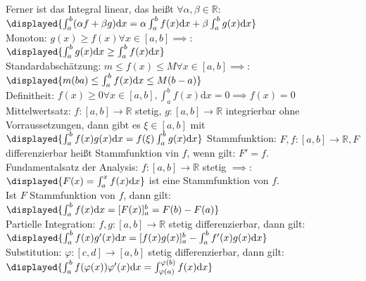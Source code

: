 \documentclass[9pt, landscape,a4paper]{extarticle}
\renewcommand{\phi}{\varphi}
\renewcommand\d{\mathrm{d}}
\begin{document}
\begin{multicols*}{4}
  Ferner ist das Integral linear, das heißt $\forall \alpha,\beta \in \mathbb{R}$: \\
  $\displayed{\int_a^b (\alpha f + \beta g)\d x = \alpha \int_a^b f(x)\d x + \beta \int_a^b g(x)\d x}$ \\
  Monoton: $g(x) \geq f(x) \forall x\in[a,b] \implies$: \\
  $\displayed{\int_a^b g(x) \d x \geq \int_a^b f(x) \d x}$ \\
  Standardabschätzung: $m \leq f(x) \leq M \forall x\in[a,b] \implies$: \\
  $\displayed{m(b  a)  \leq \int_a^b f(x) \d x \leq M(b - a)}$ \\
  Definitheit: $f(x) \geq 0 \forall x\in [a,b], \int_a^b f(x)\d x = 0 \implies f(x) = 0$ \\
  Mittelwertsatz: $f:[a,b] \to\mathbb{R}$ stetig, $g:[a,b] \to\mathbb{R}$ integrierbar ohne Vorraussetzungen, dann gibt es $\xi\in [a,b]$ mit \\
  $\displayed{\int_a^b f(x)g(x) \d x = f(\xi)\int_a^b g(x)\d x}$
  Stammfunktion: $F, f:[a,b] \to\mathbb{R}, F$ differenzierbar heißt Stammfunktion vin $f$, wenn gilt: $F' = f$. \\
  Fundamentalsatz der Analysis: $f:[a,b] \to\mathbb{R}$ stetig $\implies$: \\
  $\displayed{F(x) = \int_a^x f(x) \d x}$ ist eine Stammfunktion von $f$. \\
  Ist $F$ Stammfunktion von $f$, dann gilt: \\
  $\displayed{\int_a^b f(x) \d x = [F(x)]_a^b = F(b) - F(a)}$ \\
  Partielle Integration: $f,g:[a,b] \to \mathbb{R}$ stetig differenzierbar, dann gilt: \\
  $\displayed{\int_a^b f(x) g'(x)\d x = [f(x) g(x)]_a^b - \int_a^b f'(x)g(x) \d x}$ \\
  Substitution: $\phi:[c,d] \to [a,b]$ stetig differenzierbar, dann gilt: \\
  $\displayed{\int_a^b f(\phi(x)) \phi'(x)\d x = \int_{\phi(a)}^{\phi(b)} f(x) \d x}$
\end{multicols*}
\end{document}
